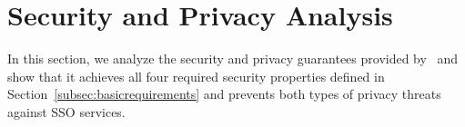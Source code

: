 \section{Security and Privacy Analysis}
\label{sec:analysis}
In this section, we analyze the security and privacy guarantees provided by \usso~and show that it achieves all four required security properties defined in Section~\ref{subsec:basicrequirements} and prevents both types of privacy threats against SSO services.

\label{adver-model}




